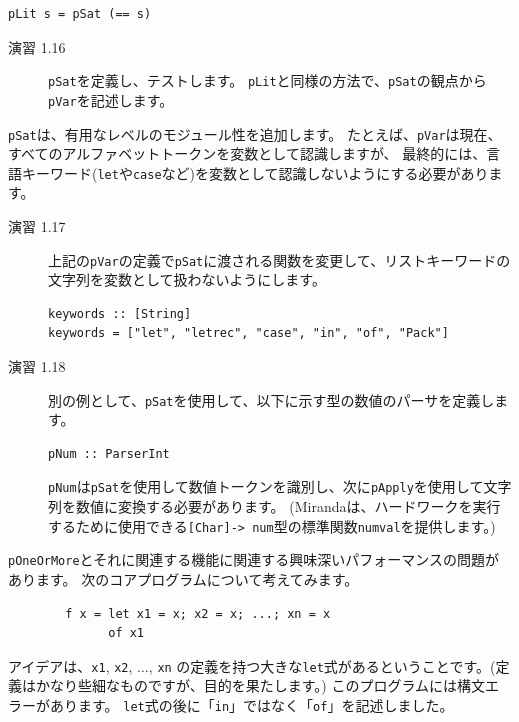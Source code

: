 \documentclass{jbook}
\begin{document}
\begin{verbatim}
pLit s = pSat (== s)
\end{verbatim}

\begin{description}
	\item[演習 1.16] \texttt{pSat}を定義し、テストします。
		\texttt{pLit}と同様の方法で、\texttt{pSat}の観点から\texttt{pVar}を記述します。
\end{description}

\texttt{pSat}は、有用なレベルのモジュール性を追加します。
たとえば、\texttt{pVar}は現在、すべてのアルファベットトークンを変数として認識しますが、
最終的には、言語キーワード(\texttt{let}や\texttt{case}など)を変数として認識しないようにする必要があります。

\begin{description}
	\item[演習 1.17] 上記の\texttt{pVar}の定義で\texttt{pSat}に渡される関数を変更して、リストキーワードの文字列を変数として扱わないようにします。

		\begin{verbatim}
keywords :: [String]
keywords = ["let", "letrec", "case", "in", "of", "Pack"]
\end{verbatim}

	\item[演習 1.18] 別の例として、\texttt{pSat}を使用して、以下に示す型の数値のパーサを定義します。

		\begin{verbatim}
pNum :: ParserInt
\end{verbatim}

		\texttt{pNum}は\texttt{pSat}を使用して数値トークンを識別し、次に\texttt{pApply}を使用して文字列を数値に変換する必要があります。
		(Mirandaは、ハードワークを実行するために使用できる\texttt{[Char]-> num}型の標準関数\texttt{numval}を提供します。)
\end{description}

\texttt{pOneOrMore}とそれに関連する機能に関連する興味深いパフォーマンスの問題があります。
次のコアプログラムについて考えてみます。

\begin{verbatim}
        f x = let x1 = x; x2 = x; ...; xn = x
              of x1
\end{verbatim}

アイデアは、\texttt{x1}, \texttt{x2}, $\ldots$, \texttt{xn} の定義を持つ大きな\texttt{let}式があるということです。(定義はかなり些細なものですが、目的を果たします。)
このプログラムには構文エラーがあります。
\texttt{let}式の後に「\texttt{in}」ではなく「\texttt{of}」を記述しました。
\end{document}
